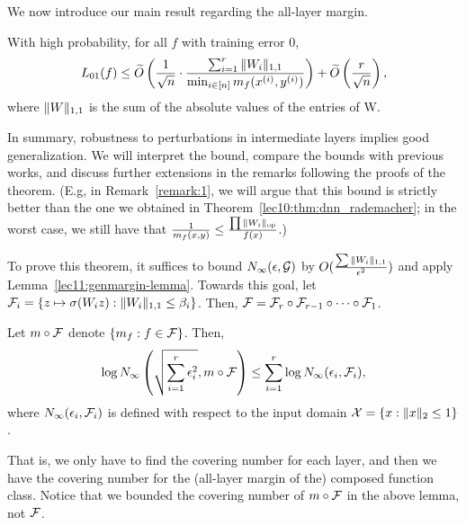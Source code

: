 We now introduce our main result regarding the all-layer margin.
\begin{theorem} \label{lec11:thm:poly_gen_bound_deep_nets}
	With high probability, for all $f$ with training error $0$,
	\begin{equation}
	L_{01}(f) \leq \widetilde{O}\left (\frac{1}{\sqrt{n}} \cdot \frac{\sum_{i=1}^r \|W_i\|_{1, 1}}{\min_{i \in [n]} m_f(x^{(i)}, y^{(i)})}\right ) + \widetilde{O}\left (\frac{r}{\sqrt{n}}\right ),
	\end{equation}
	where
	$\|W\|_{1, 1}$ is the sum of the absolute values of the entries of W.
\end{theorem}
In summary, robustness to perturbations in intermediate layers implies good generalization. We will interpret the bound, compare the bounds with previous works, and discuss further extensions in the remarks following the proofs of the theorem.  (E.g, in Remark~\ref{remark:1}, we will argue that this bound is strictly better than the one we obtained in Theorem~\ref{lec10:thm:dnn_rademacher}; in the worst case, we still have that $\frac{1}{m_f(x, y)} \leq \frac{\prod \|W_i\|_{\text{op}}}{f(x)}$.)

To prove this theorem, it suffices to bound $N_\infty(\epsilon, \mathcal G)$ by $O(\frac{\sum{\|W_i\|_{1, 1}}}{\epsilon^2})$ and apply Lemma~\ref{lec11:genmargin-lemma}. Towards this goal, let $\mathcal F_i = \{ z \mapsto \sigma (W_i z) : \|W_i\|_{1, 1} \leq \beta_i \}$. Then, $\mathcal F = \mathcal F_r \circ \mathcal F_{r-1} \circ \cdots \circ \mathcal F_1$. 

\begin{lemma}\label{lec11:lma:decomp}
	Let $m \circ \mathcal F$ denote $\{m_f : f \in \mathcal F \}$. Then, 
	\begin{equation}
	\log N_\infty\left (\sqrt{\sum_{i=1}^r \epsilon_i^2}, m \circ \mathcal F \right ) \leq \sum_{i=1}^r \log N_\infty(\epsilon_i, \mathcal F_i),
	\end{equation}
	where $N_\infty(\epsilon_i, \mathcal F_i)$ is defined with respect to the input domain $\mathcal{X} = \{x : \|x\|_2 \leq 1 \}$.
\end{lemma}

That is, we only have to find the covering number for each layer, and then we have the covering number for the (all-layer margin of the) composed function class. Notice that we bounded the covering number of $m \circ \mathcal F$ in the above lemma, not $\mathcal F$.


